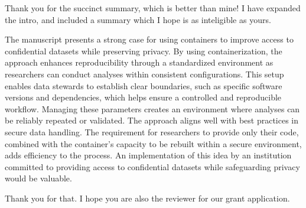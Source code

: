 \begin{response}
    Thank you for the succinct summary, which is better than mine! I have expanded the intro, and included a summary which I hope is as inteligible as yours.
\end{response}

\begin{referee}

The manuscript presents a strong case for using containers to improve access to confidential datasets while preserving privacy.  By using containerization, the approach enhances reproducibility through a standardized environment as researchers can conduct analyses within consistent configurations.  This setup enables data stewards to establish clear boundaries, such as specific software versions and dependencies, which helps ensure a controlled and reproducible workflow.  Managing these parameters creates an environment where analyses can be reliably repeated or validated. The approach aligns well with best practices in secure data handling. The requirement for researchers to provide only their code, combined with the container's capacity to be rebuilt within a secure environment, adds efficiency to the process.  An implementation of this idea by an institution committed to providing access to confidential datasets while safeguarding privacy would be valuable.  


\end{referee}

\begin{response}
    Thank you for that. I hope you are also the reviewer for our grant application.
\end{response}

